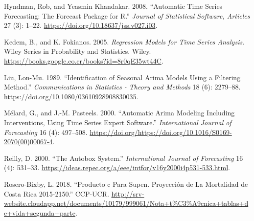 \documentclass[]{article}
\begin{document}
\leavevmode\hypertarget{ref-auto.arima}{}%
Hyndman, Rob, and Yeasmin Khandakar. 2008. ``Automatic Time Series
Forecasting: The Forecast Package for R.'' \emph{Journal of Statistical
Software, Articles} 27 (3): 1--22.
\url{https://doi.org/10.18637/jss.v027.i03}.

\leavevmode\hypertarget{ref-kedem}{}%
Kedem, B., and K. Fokianos. 2005. \emph{Regression Models for Time
Series Analysis}. Wiley Series in Probability and Statistics. Wiley.
\url{https://books.google.co.cr/books?id=8r0qE35wt44C}.

\leavevmode\hypertarget{ref-liu}{}%
Liu, Lon-Mu. 1989. ``Identification of Seasonal Arima Models Using a
Filtering Method.'' \emph{Communications in Statistics - Theory and
Methods} 18 (6): 2279--88.
\url{https://doi.org/10.1080/03610928908830035}.

\leavevmode\hypertarget{ref-melard}{}%
Mélard, G., and J.-M. Pasteels. 2000. ``Automatic Arima Modeling
Including Interventions, Using Time Series Expert Software.''
\emph{International Journal of Forecasting} 16 (4): 497--508.
\url{https://doi.org/https://doi.org/10.1016/S0169-2070(00)00067-4}.

\leavevmode\hypertarget{ref-autobox}{}%
Reilly, D. 2000. ``The Autobox System.'' \emph{International Journal of
Forecasting} 16 (4): 531--33.
\url{https://ideas.repec.org/a/eee/intfor/v16y2000i4p531-533.html}.

\leavevmode\hypertarget{ref-supenprodc}{}%
Rosero-Bixby, L. 2018. ``Producto c Para Supen. Proyección de La
Mortalidad de Costa Rica 2015-2150.'' CCP-UCR.
\url{http://srv-website.cloudapp.net/documents/10179/999061/Nota+t\%C3\%A9cnica+tablas+de+vida+segunda+parte}.
\end{document}
